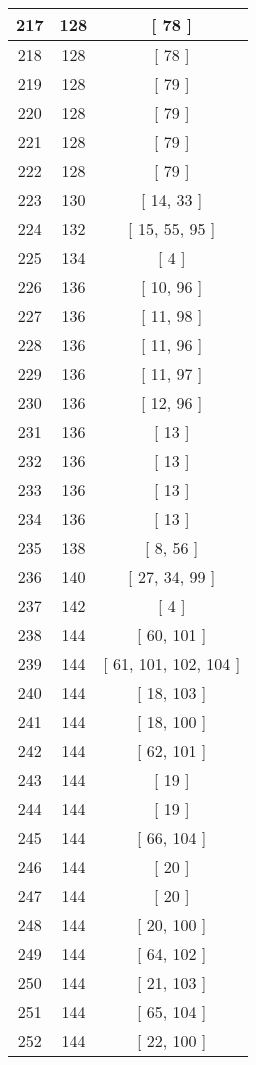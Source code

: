 \begin{center}
\begin{longtable}[H]{|| c c c ||}
\hline
217 & 128 & [ 78 ] \\ 
\hline
218 & 128 & [ 78 ] \\ 
\hline
219 & 128 & [ 79 ] \\ 
\hline
220 & 128 & [ 79 ] \\ 
\hline
221 & 128 & [ 79 ] \\ 
\hline
222 & 128 & [ 79 ] \\ 
\hline
223 & 130 & [ 14, 33 ] \\ 
\hline
224 & 132 & [ 15, 55, 95 ] \\ 
\hline
225 & 134 & [ 4 ] \\ 
\hline
226 & 136 & [ 10, 96 ] \\ 
\hline
227 & 136 & [ 11, 98 ] \\ 
\hline
228 & 136 & [ 11, 96 ] \\ 
\hline
229 & 136 & [ 11, 97 ] \\ 
\hline
230 & 136 & [ 12, 96 ] \\ 
\hline
231 & 136 & [ 13 ] \\ 
\hline
232 & 136 & [ 13 ] \\ 
\hline
233 & 136 & [ 13 ] \\ 
\hline
234 & 136 & [ 13 ] \\ 
\hline
235 & 138 & [ 8, 56 ] \\ 
\hline
236 & 140 & [ 27, 34, 99 ] \\ 
\hline
237 & 142 & [ 4 ] \\ 
\hline
238 & 144 & [ 60, 101 ] \\ 
\hline
239 & 144 & [ 61, 101, 102, 104 ] \\ 
\hline
240 & 144 & [ 18, 103 ] \\ 
\hline
241 & 144 & [ 18, 100 ] \\ 
\hline
242 & 144 & [ 62, 101 ] \\ 
\hline
243 & 144 & [ 19 ] \\ 
\hline
244 & 144 & [ 19 ] \\ 
\hline
245 & 144 & [ 66, 104 ] \\ 
\hline
246 & 144 & [ 20 ] \\ 
\hline
247 & 144 & [ 20 ] \\ 
\hline
248 & 144 & [ 20, 100 ] \\ 
\hline
249 & 144 & [ 64, 102 ] \\ 
\hline
250 & 144 & [ 21, 103 ] \\ 
\hline
251 & 144 & [ 65, 104 ] \\ 
\hline
252 & 144 & [ 22, 100 ] \\ 

\end{longtable}
\end{center}

